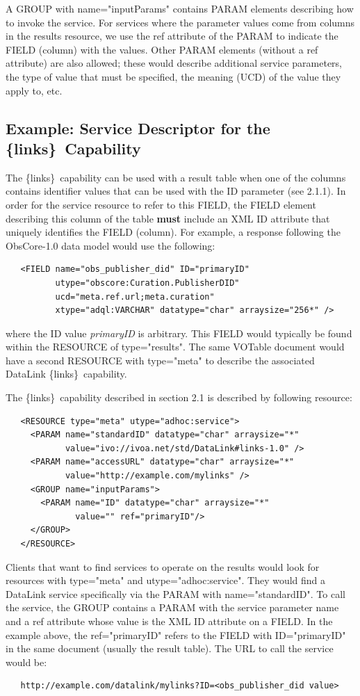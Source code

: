 \documentclass[11pt,a4paper]{ivoa}
\newcommand{\blinks}{\{links\}}
\newcommand{\attval}[2]{#1={\allowbreak}{"}#2{"}}
\begin{document}
A GROUP with \attval{name}{inputParams} contains PARAM elements describing
how to invoke the service. For services where the parameter values
come from columns in the results resource, we use the ref attribute of
the PARAM to indicate the FIELD (column) with the values. Other PARAM
elements (without a ref attribute) are also allowed; these would describe
additional service parameters, the type of value that must be specified,
the meaning (UCD) of the value they apply to, etc.


\subsection{Example: Service Descriptor for the \blinks\ Capability}

The \blinks\ capability can be used with a result table when one of the
columns contains identifier values that can be used with the ID parameter
(see 2.1.1). In order for the service resource to refer to this FIELD,
the FIELD element describing this column of the table
{\bf must} include an XML ID attribute
that uniquely identifies the FIELD (column).
For example, a response following the ObsCore-1.0 data model
would use the following:
\begin{verbatim}
   <FIELD name="obs_publisher_did" ID="primaryID"
          utype="obscore:Curation.PublisherDID"
          ucd="meta.ref.url;meta.curation"
          xtype="adql:VARCHAR" datatype="char" arraysize="256*" />
\end{verbatim}
where the ID value {\em primaryID\/} is arbitrary.
This FIELD would typically
be found within the RESOURCE of \attval{type}{results}. The same VOTable
document would have a second RESOURCE with \attval{type}{meta} to describe
the associated DataLink \blinks\ capability.

The \blinks\ capability described in section 2.1 is described
by following resource:
\begin{verbatim}
   <RESOURCE type="meta" utype="adhoc:service">
     <PARAM name="standardID" datatype="char" arraysize="*"
            value="ivo://ivoa.net/std/DataLink#links-1.0" />
     <PARAM name="accessURL" datatype="char" arraysize="*"
            value="http://example.com/mylinks" />
     <GROUP name="inputParams">
       <PARAM name="ID" datatype="char" arraysize="*"
              value="" ref="primaryID"/>
     </GROUP>
   </RESOURCE>
\end{verbatim}

Clients that want to find services to operate on the results would look
for resources with \attval{type}{meta} and \attval{utype}{adhoc:service}.
They would find a DataLink service specifically via the PARAM with
\attval{name}{standardID}. To call the service, the GROUP contains a PARAM
with the service parameter name and a ref attribute whose value is the
XML ID attribute on a FIELD. In the example above, the \attval{ref}{primaryID}
refers to the FIELD with \attval{ID}{primaryID} in the same document (usually
the result table). The URL to call the service would be:
\begin{verbatim}
   http://example.com/datalink/mylinks?ID=<obs_publisher_did value>
\end{verbatim}
\end{document}
